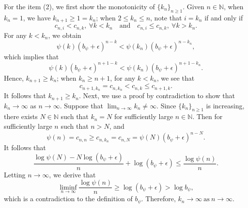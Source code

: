 \documentclass[12pt,reqno]{amsart}
\renewcommand{\=}{\coloneqq}
\theoremstyle{plain}
\begin{document}
 For the item (2), we first show the monotonicity of $\{k_n\}_{n\geq 1}$. Given $n\in \mathbb N$, when $k_n=1$, we have $k_{n+1}\geq 1= k_n$; when $2\leq k_n\leq n$, note that $i= k_n$ if and only if
    \begin{equation}\label{e.def_t_n}
        c_{n,i}<c_{n,k},\ \forall k<k_n
        \quad \mathrm{and} \quad
        c_{n, i}\leq c_{n,k},\ \forall k>k_n.
    \end{equation}
 For any $k<k_n$, we obtain
    \begin{equation*}
        \psi(k)(b_\psi+\epsilon)^{n-k}<\psi(k_n)(b_\psi+\epsilon)^{n-k_n},
    \end{equation*}
which implies that
    \begin{equation*}
        \psi(k)(b_\psi+\epsilon)^{n+1-k}
        <\psi(k_n)(b_\psi+\epsilon)^{n+1-k_n}.
    \end{equation*}
Hence, $k_{n+1}\geq k_n$; when $k_n\geq n+1$, for any $k<k_n$, we see that
    \begin{equation*}
        c_{n+1,k_n}=c_{n,k_n}< c_{n,k}\leq  c_{n+1,k}.
    \end{equation*}
It follows that $k_{n+1}\geq k_n$. Next, we use a proof by contradiction to show that $k_n\to \infty$ as $n \to \infty$. Suppose that $\lim_{n\to \infty}k_n\neq \infty$. Since $\{k_n\}_{n\geq 1}$ is increasing, there exists $N\in \mathbb N$ such that $k_n=N$ for sufficiently large $n \in \mathbb N$. Then for sufficiently large $n$ such that $n>N$, and
 \begin{equation*}
       \psi(n)=c_{n,n}\geq c_{n,k_n}=c_{n,N}
        =\psi(N)(b_\psi+\epsilon)^{n-N}.
    \end{equation*}
 It follows that
    \begin{equation*}\label{e.liminf_b}
    \frac{\log \psi(N)-N\log(b_\psi+\epsilon)}{n}
    +\log (b_\psi+\epsilon)\leq \frac{\log \psi(n)}{n}.
    \end{equation*}
Letting $n\to \infty$, we derive that
$$\liminf_{n\to \infty} \frac{\log \psi(n)}{n}\geq \log (b_\psi+\epsilon)>\log b_\psi,$$
which is a contradiction to the definition of $b_\psi$. Therefore, $k_n\to \infty \ \mathrm{as}\  n \to \infty$.
\end{document}
